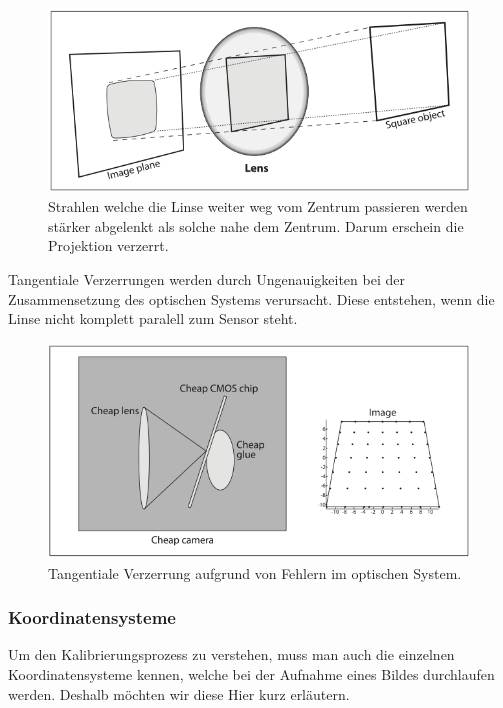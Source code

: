 \documentclass[main.tex]{subfiles}
\begin{document}
\begin{figure}[!ht]
\centering
\includegraphics[scale=0.5]{images/radial-disortion.png} 
\caption{Strahlen welche die Linse weiter weg vom Zentrum passieren werden stärker abgelenkt als solche nahe dem Zentrum. Darum erschein die Projektion verzerrt.\protect\cite{learningopencv}}
\label{fig:radial-disortion}
\end{figure}

Tangentiale Verzerrungen werden durch Ungenauigkeiten bei der Zusammensetzung des optischen Systems verursacht. Diese entstehen, wenn die Linse nicht komplett paralell zum Sensor steht.

\begin{figure}[!ht]
\centering
\includegraphics[scale=0.5]{images/tangential-disortion.png} 
\caption{Tangentiale Verzerrung aufgrund von Fehlern im optischen System.\protect\cite{learningopencv}}
\label{fig:tangential-disortion}
\end{figure}

\subsubsection{Koordinatensysteme}
Um den Kalibrierungsprozess zu verstehen, muss man auch die einzelnen Koordinatensysteme kennen, welche bei der Aufnahme eines Bildes durchlaufen werden. Deshalb möchten wir diese Hier kurz erläutern.
\end{document}
